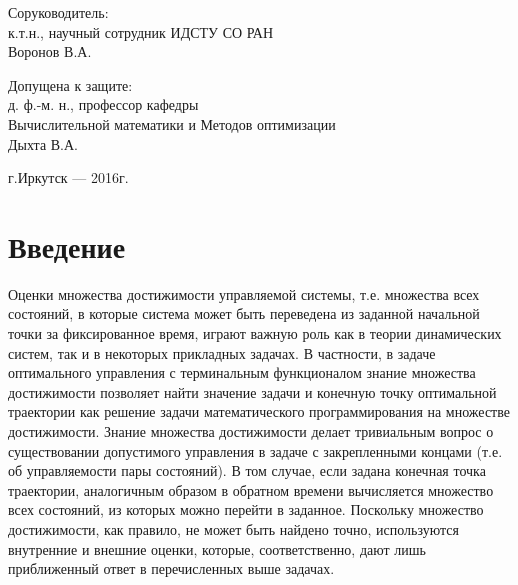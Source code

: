 \documentclass[a4paper,12pt]{article}
\begin{document}
\begin{titlepage}
\begin{singlespacing}
\begin{flushright}
{                \vspace{1em}

                Соруководитель:\\
                к.т.н., научный сотрудник ИДСТУ СО РАН\\
                \underline{\phantom{Четкая подпись}} Воронов В.А. 

                \vspace{1em}

                Допущена к защите:\\
                д. ф.-м. н., профессор кафедры\\ Вычислительной математики и Методов оптимизации \\ 
                \underline{\phantom{Четкая подпись}} Дыхта В.А. 

            }
        \end{flushright}

        \vspace{\fill}

        \begin{center}
            г.Иркутск --- 2016г.
        \end{center}

    \end{singlespacing}
\end{titlepage}

\tableofcontents
\pagebreak
\section*{Введение}
\label{intro}

Оценки множества достижимости управляемой системы, т.е. множества всех
состояний, в которые система может быть переведена из заданной
начальной точки за фиксированное время, играют важную роль как в
теории динамических систем, так и в некоторых прикладных задачах.  В
частности, в задаче оптимального управления с терминальным
функционалом знание множества достижимости позволяет найти значение
задачи и конечную точку оптимальной траектории как решение задачи
математического программирования на множестве достижимости. Знание
множества достижимости делает тривиальным вопрос о существовании
допустимого управления в задаче с закрепленными концами (т.е. об
управляемости пары состояний).  В том случае, если задана конечная
точка траектории, аналогичным образом в обратном времени вычисляется
множество всех состояний, из которых можно перейти в заданное.
Поскольку множество достижимости, как правило, не может быть найдено
точно, используются внутренние и внешние оценки, которые,
соответственно, дают лишь приближенный ответ в перечисленных выше
задачах.
\end{document}
